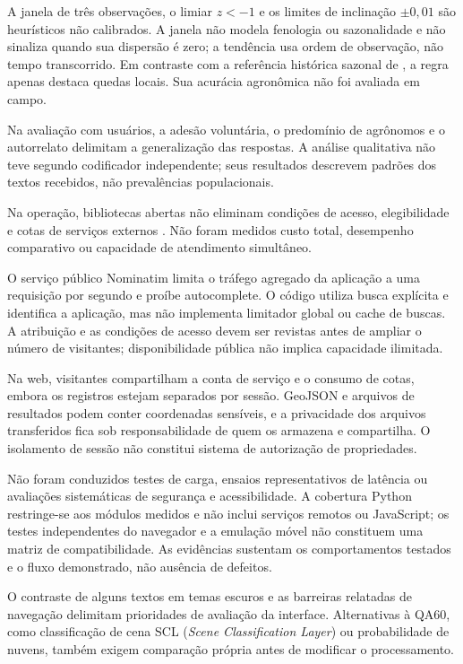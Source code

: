 A janela de três observações, o limiar $z<-1$ e os limites de inclinação $\pm0{,}01$ são heurísticos não calibrados. A janela não modela fenologia ou sazonalidade e não sinaliza quando sua dispersão é zero; a tendência usa ordem de observação, não tempo transcorrido. Em contraste com a referência histórica sazonal de \citet{MERONI2019}, a regra apenas destaca quedas locais. Sua acurácia agronômica não foi avaliada em campo.

Na avaliação com usuários, a adesão voluntária, o predomínio de agrônomos e o autorrelato delimitam a generalização das \UsuariosN{} respostas. A análise qualitativa não teve segundo codificador independente; seus resultados descrevem padrões dos textos recebidos, não prevalências populacionais.

Na operação, bibliotecas abertas não eliminam condições de acesso, elegibilidade e cotas de serviços externos \citep{GOOGLE_EE_NONCOMMERCIAL,NOMINATIM_POLICY}. Não foram medidos custo total, desempenho comparativo ou capacidade de atendimento simultâneo.

O serviço público Nominatim limita o tráfego agregado da aplicação a uma requisição por segundo e proíbe autocomplete. O código utiliza busca explícita e identifica a aplicação, mas não implementa limitador global ou cache de buscas. A atribuição e as condições de acesso devem ser revistas antes de ampliar o número de visitantes; disponibilidade pública não implica capacidade ilimitada.

Na web, visitantes compartilham a conta de serviço e o consumo de cotas, embora os registros estejam separados por sessão. GeoJSON e arquivos de resultados podem conter coordenadas sensíveis, e a privacidade dos arquivos transferidos fica sob responsabilidade de quem os armazena e compartilha. O isolamento de sessão não constitui sistema de autorização de propriedades.

Não foram conduzidos testes de carga, ensaios representativos de latência ou avaliações sistemáticas de segurança e acessibilidade. A cobertura Python restringe-se aos módulos medidos e não inclui serviços remotos ou JavaScript; os testes independentes do navegador e a emulação móvel não constituem uma matriz de compatibilidade. As evidências sustentam os comportamentos testados e o fluxo demonstrado, não ausência de defeitos.

O contraste de alguns textos em temas escuros e as barreiras relatadas de navegação delimitam prioridades de avaliação da interface. Alternativas à QA60, como classificação de cena SCL (\textit{Scene Classification Layer}) ou probabilidade de nuvens, também exigem comparação própria antes de modificar o processamento.
